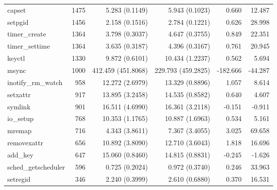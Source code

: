 \begin{longtable}{>{\ttfamily}lrrrrr}
                         capset &       1475 &           5.283 (0.1149) &           5.943 (0.1023) &           0.660 &       12.487 \\
                        setpgid &       1456 &           2.158 (0.1516) &           2.784 (0.1221) &           0.626 &       28.998 \\
                  timer\_create &       1364 &           3.798 (0.3037) &           4.647 (0.3755) &           0.849 &       22.351 \\
                 timer\_settime &       1364 &           3.635 (0.3187) &           4.396 (0.3167) &           0.761 &       20.945 \\
                         keyctl &       1330 &           9.872 (0.6101) &          10.434 (1.2237) &           0.562 &        5.694 \\
                          msync &       1000 &       412.459 (451.8068) &       229.793 (459.2825) &        -182.666 &      -44.287 \\
             inotify\_rm\_watch &        958 &          12.272 (2.6979) &          13.329 (0.8896) &           1.057 &        8.614 \\
                       setxattr &        917 &          13.895 (3.2458) &          14.535 (0.8582) &           0.640 &        4.607 \\
                        symlink &        901 &          16.511 (4.6990) &          16.361 (3.2118) &          -0.151 &       -0.911 \\
                      io\_setup &        768 &          10.353 (1.1765) &          10.887 (1.6963) &           0.534 &        5.161 \\
                         mremap &        716 &           4.343 (3.8611) &           7.367 (3.4055) &           3.025 &       69.658 \\
                    removexattr &        656 &          10.892 (3.8090) &          12.710 (3.6043) &           1.818 &       16.696 \\
                       add\_key &        647 &          15.060 (0.8460) &          14.815 (0.8831) &          -0.245 &       -1.626 \\
            sched\_getscheduler &        596 &           0.725 (0.2024) &           0.972 (0.3740) &           0.246 &       33.963 \\
                       setregid &        346 &           2.240 (0.3999) &           2.610 (0.6880) &           0.370 &       16.531 \\

\end{longtable}
